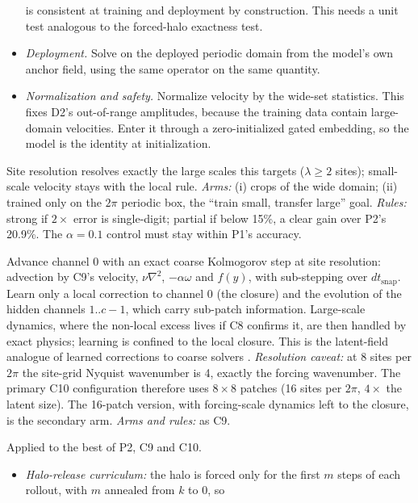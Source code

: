 \documentclass[11pt]{article}
\begin{document}
\begin{description}[leftmargin=*]
\begin{itemize}[leftmargin=*]
    is consistent at training and deployment by construction. This needs
    a unit test analogous to the forced-halo exactness test.
  \item \emph{Deployment.} Solve on the deployed periodic domain from the
    model's own anchor field, using the same operator on the same
    quantity.
  \item \emph{Normalization and safety.} Normalize velocity by the
    wide-set statistics. This fixes D2's out-of-range amplitudes, because
    the training data contain large-domain velocities. Enter it through a
    zero-initialized gated embedding, so the model is the identity at
    initialization.
  \end{itemize}
  Site resolution resolves exactly the large scales this targets
  ($\lambda\ge2$ sites); small-scale velocity stays with the local rule.
  \emph{Arms:} (i) crops of the wide domain; (ii) trained only on the
  $2\pi$ periodic box, the ``train small, transfer large'' goal.
  \emph{Rules:} strong if $2\times$ error is single-digit; partial if
  below 15\%, a clear gain over P2's 20.9\%. The $\alpha{=}0.1$ control
  must stay within P1's accuracy.
\item[C10 --- physics-anchored hybrid propagator.] Advance channel 0 with
  an exact coarse Kolmogorov step at site resolution: advection by C9's
  velocity, $\nu\nabla^2$, $-\alpha\omega$ and $f(y)$, with sub-stepping
  over $dt_{\mathrm{snap}}$. Learn only a local correction to channel 0
  (the closure) and the evolution of the hidden channels $1..c{-}1$,
  which carry sub-patch information. Large-scale dynamics, where the
  non-local excess lives if C8 confirms it, are then handled by exact
  physics; learning is confined to the local closure. This is the
  latent-field analogue of learned corrections to coarse solvers
  \cite{barsinai2019,kochkov2021}. \emph{Resolution caveat:} at 8 sites
  per $2\pi$ the site-grid Nyquist wavenumber is 4, exactly the forcing
  wavenumber. The primary C10 configuration therefore uses $8\times8$
  patches (16 sites per $2\pi$, $4\times$ the latent size). The 16-patch
  version, with forcing-scale dynamics left to the closure, is the
  secondary arm. \emph{Arms and rules:} as C9.
\item[C11 --- release the halo; train on long-horizon statistics.]
  Applied to the best of P2, C9 and C10.
  \begin{itemize}[leftmargin=*]
  \item \emph{Halo-release curriculum:} the halo is forced only for the
    first $m$ steps of each rollout, with $m$ annealed from $k$ to 0, so

\end{itemize}
\end{description}
\end{document}
